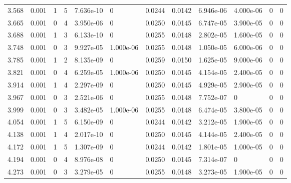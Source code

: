 \documentclass[preview]{standalone}
\begin{document}
{{{\begin{tabular}{L{1.2cm}C{1.2cm} C{0.3cm}C{0.5cm} C{1.4cm}C{1.4cm} C{1.4cm}C{1.4cm} C{1.6cm}C{1.6cm} C{1.6cm}C{1.6cm}}
  3.568  &  0.001  & 1     &  5 &  7.636e-10  & 0  &  0.0244&   0.0142& 6.946e-06 & 4.000e-06   &  0 & 0  \\ 
  3.665  &  0.001  & 0     &  4 &  3.950e-06  & 0  &  0.0250&   0.0145& 6.747e-05 & 3.900e-05   &  0 & 0  \\ 
  3.688  &  0.001  & 1     &  3 &  6.133e-10  & 0  &  0.0255&   0.0148& 2.802e-05 & 1.600e-05   &  0 & 0  \\ 
  3.748  &  0.001  & 0     &  3 &  9.927e-05  & 1.000e-06  &  0.0255&   0.0148& 1.050e-05 & 6.000e-06   &  0 & 0  \\ 
  3.785  &  0.001  & 1     &  2 &  8.135e-09  & 0  &  0.0259&   0.0150& 1.625e-05 & 9.000e-06   &  0 & 0  \\ 
  3.821  &  0.001  & 0     &  4 &  6.259e-05  & 1.000e-06  &  0.0250&   0.0145& 4.154e-05 & 2.400e-05   &  0 & 0  \\ 
  3.914  &  0.001  & 1     &  4 &  2.297e-09  & 0  &  0.0250&   0.0145& 4.929e-05 & 2.900e-05   &  0 & 0  \\ 
  3.967  &  0.001  & 0     &  3 &  2.521e-06  & 0  &  0.0255&   0.0148& 7.752e-07 & 0   &  0 & 0  \\ 
  3.999  &  0.001  & 0     &  3 &  3.482e-05  & 1.000e-06  &  0.0255&   0.0148& 6.474e-05 & 3.800e-05   &  0 & 0  \\ 
  4.054  &  0.001  & 1     &  5 &  6.150e-09  & 0  &  0.0244&   0.0142& 3.212e-05 & 1.900e-05   &  0 & 0  \\ 
  4.138  &  0.001  & 1     &  4 &  2.017e-10  & 0  &  0.0250&   0.0145& 4.144e-05 & 2.400e-05   &  0 & 0  \\ 
  4.172  &  0.001  & 1     &  5 &  1.307e-09  & 0  &  0.0244&   0.0142& 1.801e-05 & 1.000e-05   &  0 & 0  \\ 
  4.194  &  0.001  & 0     &  4 &  8.976e-08  & 0  &  0.0250&   0.0145& 7.314e-07 & 0   &  0 & 0  \\ 
  4.273  &  0.001  & 0     &  3 &  3.279e-05  & 0  &  0.0255&   0.0148& 3.273e-05 & 1.900e-05   &  0 & 0  \\ 
\hline 
\end{tabular} 

}}}
\end{document}
